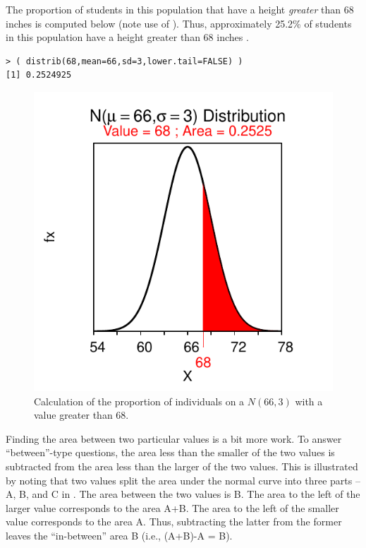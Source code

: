 \documentclass[10pt,openany]{book}\usepackage[]{graphicx}\usepackage[]{color}
\makeatletter
\newenvironment{kframe}{%
 \def\at@end@of@kframe{}%
 \ifinner\ifhmode%
  \def\at@end@of@kframe{\end{minipage}}%
  \begin{minipage}{\columnwidth}%
 \fi\fi%
 \def\FrameCommand##1{\hskip\@totalleftmargin \hskip-\fboxsep
 \colorbox{shadecolor}{##1}\hskip-\fboxsep
     \hskip-\linewidth \hskip-\@totalleftmargin \hskip\columnwidth}%
 \MakeFramed {\advance\hsize-\width
   \@totalleftmargin\z@ \linewidth\hsize
   \@setminipage}}%
 {\par\unskip\endMakeFramed%
 \at@end@of@kframe}
\newenvironment{knitrout}{}{} %
\makeatother
\begin{document}
The proportion of students in this population that have a height \textit{greater} than 68 inches is computed below (note use of ). Thus, approximately 25.2\% of students in this population have a height greater than 68 inches .
\begin{knitrout}
\color{fgcolor}\begin{kframe}
\begin{verbatim}
> ( distrib(68,mean=66,sd=3,lower.tail=FALSE) )
[1] 0.2524925
\end{verbatim}
\end{kframe}\begin{figure}[hbtp]

{\centering \includegraphics[width=.4\linewidth]{Figs/NormZCalc2-1} 

}

\caption[Calculation of the proportion of individuals on a $N(66,3)$ with a value greater than 68]{Calculation of the proportion of individuals on a $N(66,3)$ with a value greater than 68.}\label{fig:NormZCalc2}
\end{figure}


\end{knitrout}

Finding the area between two particular values is a bit more work. To answer ``between''-type questions, the area less than the smaller of the two values is subtracted from the area less than the larger of the two values. This is illustrated by noting that two values split the area under the normal curve into three parts -- A, B, and C in . The area between the two values is B. The area to the left of the larger value corresponds to the area A+B. The area to the left of the smaller value corresponds to the area A. Thus, subtracting the latter from the former leaves the ``in-between'' area B (i.e., (A+B)-A = B).
\end{document}

